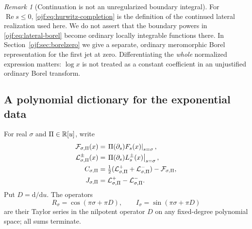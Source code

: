\documentclass[11pt,a4paper]{article}
\numberwithin{equation}{section}
\theoremstyle{definition}\newtheorem{definition}[theorem]{Definition}
\theoremstyle{remark}\newtheorem{remark}[theorem]{Remark}
\newcommand{\Rea}{\operatorname{Re}}\newcommand{\Ima}{\operatorname{Im}}
\begin{document}
\begin{remark}[Continuation is not an unregularized boundary integral]
For $\Rea s\le0$, \eqref{ojf:eq:hurwitz-completion} is the definition of
the continued lateral realization used here. We do not assert that the
boundary powers in \eqref{ojf:eq:lateral-borel} become ordinary locally
integrable functions there. In Section~\ref{ojf:sec:borelzero} we give a
separate, ordinary meromorphic Borel representation for the first jet
at zero. Differentiating the \emph{whole} normalized expression matters:
$\log x$ is not treated as a constant coefficient in an unjustified
ordinary Borel transform.
\end{remark}

\subsection{A polynomial dictionary for the exponential data}
For real $\sigma$ and $\Pi\in\mathbb R[u]$, write
\begin{align}
 \mathcal F_{\sigma,\Pi}(x)&=
       \left.\Pi(\partial_s)F_s(x)\right|_{s=\sigma},\label{ojf:eq:observable}\\
 \mathcal L^\pm_{\sigma,\Pi}(x)&=
       \left.\Pi(\partial_s)L_s^\pm(x)\right|_{s=\sigma},\notag\\
 C_{\sigma,\Pi}&=\tfrac12(\mathcal L^+_{\sigma,\Pi}+
                           \mathcal L^-_{\sigma,\Pi})-\mathcal F_{\sigma,\Pi},\notag\\
 J_{\sigma,\Pi}&=\mathcal L^+_{\sigma,\Pi}-\mathcal L^-_{\sigma,\Pi}.\notag
\end{align}
Put $D=\mathrm d/\mathrm du$. The operators
\begin{equation}\label{ojf:eq:operators}
 R_\sigma=\cos(\pi\sigma+\pi D),\qquad
 I_\sigma=\sin(\pi\sigma+\pi D)
\end{equation}
are their Taylor series in the nilpotent operator $D$ on any fixed-degree
polynomial space; all sums terminate.
\end{document}
